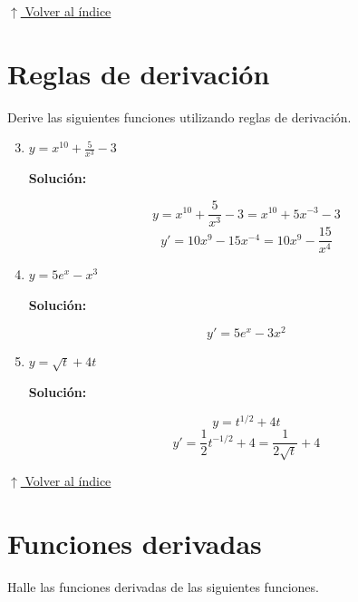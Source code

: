 \documentclass[12pt]{article}
\newcommand{\solucion}{%
    \vspace{0.8em}%
    \textbf{Solución:}%
}
\newcommand{\volverindice}{%
    \vspace{1em}%
    \begin{flushright}%
        \hyperlink{indice}{\small $\uparrow$ Volver al índice}%
    \end{flushright}%
}
\begin{document}
\volverindice
\newpage

\section{Reglas de derivación}

Derive las siguientes funciones utilizando reglas de derivación.

\begin{enumerate}[label=\alph*.-]
        \setcounter{enumi}{2} %
    \item $y = x^{10}+\frac{5}{x^3} - 3$

    \solucion
    \[
    y = x^{10} + \frac{5}{x^3} - 3 = x^{10} + 5x^{-3} - 3
    \]
    \[
    y' = 10x^9 - 15x^{-4} = 10x^9 - \frac{15}{x^4}
    \]

    \setcounter{enumi}{3} %
    \item $y = 5e^x - x^3$

    \solucion
    \[
    y' = 5e^x - 3x^2
    \]

    \setcounter{enumi}{5} %
    \item $y = \sqrt{t} + 4t$

    \solucion
    \[
    y = t^{1/2} + 4t
    \]
    \[
    y' = \frac{1}{2}t^{-1/2} + 4 = \frac{1}{2\sqrt{t}} + 4
    \]
\end{enumerate}

\volverindice
\newpage

\section{Funciones derivadas}

Halle las funciones derivadas de las siguientes funciones.
\end{document}

